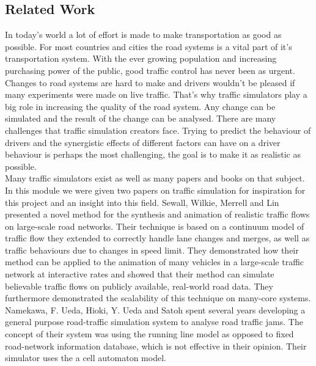 \documentclass[11pt]{article}
\begin{document}
	\subsection{Related Work}
\indent\indent In today's world a lot of effort is made to make transportation as good as possible. For most countries and cities the road systems is a vital part of it's transportation system. With the ever growing population and increasing purchasing power of the public, good traffic control has never been as urgent. Changes to road systems are hard to make and drivers wouldn't be pleased if many experiments were made on live traffic. That's why traffic simulators play a big role in increasing the quality of the road system. Any change can be simulated and the result of the change can be analysed. There are many challenges that traffic simulation creators face. Trying to predict the behaviour of drivers and the synergistic effects of different factors can have on a driver behaviour is perhaps the most challenging, the goal is to make it as realistic as possible.\\

Many traffic simulators exist as well as many papers and books on that subject. In this module we were given two papers on traffic simulation for inspiration for this project and an insight into this field. Sewall, Wilkie, Merrell and Lin \cite{sewall2010continuum}presented a novel method for the synthesis and animation of realistic traffic flows on large-scale road networks. Their technique is based on a continuum model of traffic flow they extended to correctly handle lane changes and merges, as well as traffic behaviours due to changes in speed limit. They demonstrated how their method can be applied to the animation of many vehicles in a large-scale traffic network at interactive rates and showed that their method can simulate believable traffic flows on publicly available, real-world road data. They furthermore demonstrated the scalability of this technique on many-core systems.\\

Namekawa, F. Ueda, Hioki, Y. Ueda and Satoh \cite{namekawa2005general} spent several years developing a general purpose road-traffic simulation system to analyse road traffic jams. The concept of their system was using the running line model as opposed to fixed road-network information database, which is not effective in their opinion. Their simulator uses the a cell automaton model.
\end{document}

